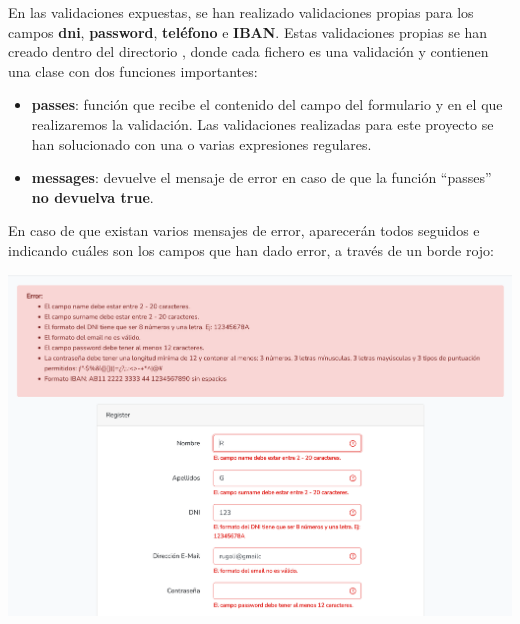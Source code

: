 \documentclass{\ClassPath/viu-tfm-template}
\begin{document}

En las validaciones expuestas, se han realizado validaciones propias para los campos \textbf{dni}, \textbf{password}, \textbf{teléfono} e \textbf{IBAN}. Estas validaciones propias se han creado dentro del directorio , donde cada fichero es una validación y contienen una clase con dos funciones importantes:

\begin{itemize}
    \item \textbf{passes}: función que recibe el contenido del campo del formulario y en el que realizaremos la validación. Las validaciones realizadas para este proyecto se han solucionado con una o varias expresiones regulares.

    \item \textbf{messages}: devuelve el mensaje de error en caso de que la función “passes” \textbf{no devuelva true}.
\end{itemize}

En caso de que existan varios mensajes de error, aparecerán todos seguidos e indicando cuáles son los campos que han dado error, a través de un borde rojo:

\begin{center}
    \includegraphics[frame,width=0.9\linewidth]{img/errores.png}
\end{center}
\end{document}
